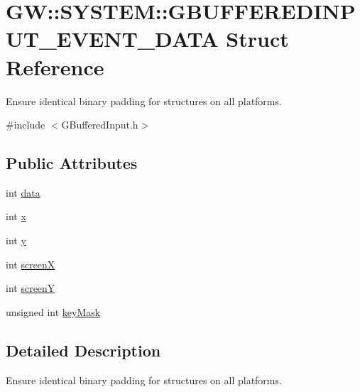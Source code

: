 \hypertarget{struct_g_w_1_1_s_y_s_t_e_m_1_1_g_b_u_f_f_e_r_e_d_i_n_p_u_t___e_v_e_n_t___d_a_t_a}{}\section{GW\+:\+:S\+Y\+S\+T\+EM\+:\+:G\+B\+U\+F\+F\+E\+R\+E\+D\+I\+N\+P\+U\+T\+\_\+\+E\+V\+E\+N\+T\+\_\+\+D\+A\+TA Struct Reference}
\label{struct_g_w_1_1_s_y_s_t_e_m_1_1_g_b_u_f_f_e_r_e_d_i_n_p_u_t___e_v_e_n_t___d_a_t_a}


Ensure identical binary padding for structures on all platforms.  




{\ttfamily \#include $<$G\+Buffered\+Input.\+h$>$}

\subsection*{Public Attributes}
\begin{DoxyCompactItemize}
\item 
int \mbox{\hyperlink{struct_g_w_1_1_s_y_s_t_e_m_1_1_g_b_u_f_f_e_r_e_d_i_n_p_u_t___e_v_e_n_t___d_a_t_a_abe62d14dd92dc136e8ab4f53ee26d794}{data}}
\item 
int \mbox{\hyperlink{struct_g_w_1_1_s_y_s_t_e_m_1_1_g_b_u_f_f_e_r_e_d_i_n_p_u_t___e_v_e_n_t___d_a_t_a_a055e18b0d2aa3135ca8237bb06a0b4cb}{x}}
\item 
int \mbox{\hyperlink{struct_g_w_1_1_s_y_s_t_e_m_1_1_g_b_u_f_f_e_r_e_d_i_n_p_u_t___e_v_e_n_t___d_a_t_a_a68facd2e2754c908ecf8b8ef4ce34e08}{y}}
\item 
int \mbox{\hyperlink{struct_g_w_1_1_s_y_s_t_e_m_1_1_g_b_u_f_f_e_r_e_d_i_n_p_u_t___e_v_e_n_t___d_a_t_a_a8c87335f76992eddba30abe7312b5b43}{screenX}}
\item 
int \mbox{\hyperlink{struct_g_w_1_1_s_y_s_t_e_m_1_1_g_b_u_f_f_e_r_e_d_i_n_p_u_t___e_v_e_n_t___d_a_t_a_a066fa9b2dc654907d13590612238354d}{screenY}}
\item 
unsigned int \mbox{\hyperlink{struct_g_w_1_1_s_y_s_t_e_m_1_1_g_b_u_f_f_e_r_e_d_i_n_p_u_t___e_v_e_n_t___d_a_t_a_a7a818ba319e6693b89099938368a699e}{key\+Mask}}
\end{DoxyCompactItemize}


\subsection{Detailed Description}
Ensure identical binary padding for structures on all platforms. 

